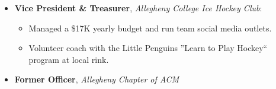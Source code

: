 \begin{itemize}
\item \textbf{Vice President \& Treasurer}, \textit{Allegheny College Ice Hockey Club}:

\begin{itemize}
    \item Managed a \$17K yearly budget and run team social media outlets.
    \item Volunteer coach with the Little Penguins ''Learn to Play Hockey`` program at local rink.
\end{itemize}

\item \textbf{Former Officer}, \textit{Allegheny Chapter of ACM}
\end{itemize}




